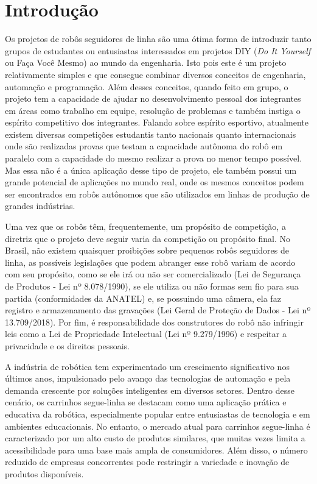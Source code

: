 \chapter[Introdução]{Introdução}

Os projetos de robôs seguidores de linha são uma ótima forma de introduzir tanto grupos de estudantes ou entusiastas interessados em projetos DIY (\textit{Do It Yourself} ou Faça Você Mesmo) ao mundo da engenharia. Isto pois este é um projeto relativamente simples e que consegue combinar diversos conceitos de engenharia, automação e programação. Além desses conceitos, quando feito em grupo, o projeto tem a capacidade de ajudar no desenvolvimento pessoal dos integrantes em áreas como trabalho em equipe, resolução de problemas e também instiga o espírito competitivo dos integrantes. Falando sobre espírito esportivo, atualmente existem diversas competições estudantis tanto nacionais quanto internacionais onde são realizadas provas que testam a capacidade autônoma do robô em paralelo com a capacidade do mesmo realizar a prova no menor tempo possível. Mas essa não é a única aplicação desse tipo de projeto, ele também possui um grande potencial de aplicações no mundo real, onde os mesmos conceitos podem ser encontrados em robôs autônomos que são utilizados em linhas de produção de grandes indústrias.

Uma vez que os robôs têm, frequentemente, um propósito de competição, a diretriz que o projeto deve seguir varia da competição ou propósito final. No Brasil, não existem quaisquer proibições sobre pequenos robôs seguidores de linha, as possíveis legislações que podem abranger esse robô variam de acordo com seu propósito, como se ele irá ou não ser comercializado (Lei de Segurança de Produtos - Lei nº 8.078/1990), se ele utiliza ou não formas sem fio para sua partida (conformidades da ANATEL) e, se possuindo uma câmera, ela faz registro e armazenamento das gravações (Lei Geral de Proteção de Dados - Lei nº 13.709/2018). Por fim, é responsabilidade dos construtores do robô não infringir leis como a Lei de Propriedade Intelectual (Lei nº 9.279/1996) e respeitar a privacidade e os direitos pessoais.

A indústria de robótica tem experimentado um crescimento significativo nos últimos anos, impulsionado pelo avanço das tecnologias de automação e pela demanda crescente por soluções inteligentes em diversos setores. Dentro desse cenário, os carrinhos segue-linha se destacam como uma aplicação prática e educativa da robótica, especialmente popular entre entusiastas de tecnologia e em ambientes educacionais. No entanto, o mercado atual para carrinhos segue-linha é caracterizado por um alto custo de produtos similares, que muitas vezes limita a acessibilidade para uma base mais ampla de consumidores. Além disso, o número reduzido de empresas concorrentes pode restringir a variedade e inovação de produtos disponíveis.

